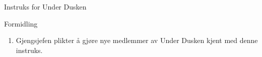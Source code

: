 \begin{instruks*}{Instruks for Under Dusken}
    \begin{instruksledd}{Formidling}
        \begin{enumerate}
            \item Gjengsjefen plikter å gjøre nye medlemmer av Under Dusken kjent med denne
                instruks.
        \end{enumerate}
    \end{instruksledd}


\end{instruks*}


